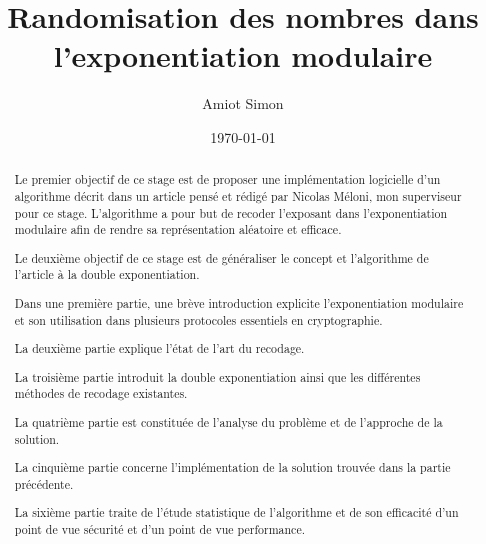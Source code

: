 \documentclass[12pt, a4paper]{memoir}
\title{ Randomisation des nombres dans l'exponentiation modulaire }%
\author{Amiot Simon}
\date{ \today} %
\begin{document}
\frontmatter\begin{titlingpage}\maketitle\end{titlingpage}

\newtheorem{Construction}{Construction de $D_{max}$}
\newtheorem{Propriété}{Propriété}
\newtheorem{Remarque}{Remarque}
\newtheorem{Preuve}{Preuve}
\newtheorem{Proposition}{Proposition}
\newtheorem{Corollaire}{Corollaire}
\newtheorem{Exemple}{Exemple}
\newtheorem{Definition}{Definition}

\abstractintoc
\begin{abstract}
Le premier objectif de ce stage est de proposer une implémentation logicielle d'un algorithme décrit dans un article
pensé et rédigé par Nicolas Méloni, mon superviseur pour ce stage. L'algorithme a pour but de recoder l'exposant
dans l'exponentiation modulaire afin de rendre sa représentation aléatoire et efficace.

Le deuxième objectif de ce stage est de généraliser le concept et l'algorithme de l'article à la double exponentiation.

\end{abstract}
\abstractintoc
\renewcommand\abstractname{R\'esum\'e}
\begin{abstract}
Dans une première partie, une brève introduction explicite l'exponentiation modulaire et son utilisation dans plusieurs 
protocoles essentiels en cryptographie.

La deuxième partie explique l'état de l'art du recodage.

La troisième partie introduit la double exponentiation ainsi que les différentes méthodes de recodage existantes.

La quatrième partie est constituée de l'analyse du problème et de l'approche de la solution.

La cinquième partie concerne l'implémentation de la solution trouvée dans la partie précédente.

La sixième partie traite de l'étude statistique de l'algorithme et de son efficacité d'un point de vue sécurité
et d'un point de vue performance.

\end{abstract}
\end{document}
